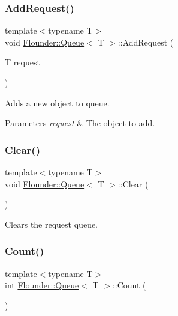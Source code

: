 \subsubsection{\texorpdfstring{Add\+Request()}{AddRequest()}}
{\footnotesize\ttfamily template$<$typename T$>$ \\
void \hyperlink{class_flounder_1_1_queue}{Flounder\+::\+Queue}$<$ T $>$\+::Add\+Request (\begin{DoxyParamCaption}\item[{T}]{request }\end{DoxyParamCaption})\hspace{0.3cm}{\ttfamily [inline]}}



Adds a new object to queue. 


\begin{DoxyParams}{Parameters}
{\em request} & The object to add. \\
\hline
\end{DoxyParams}
\mbox{\label{class_flounder_1_1_queue_afbaa486e15b7f7b6c08dd568e75024a6}} 
\subsubsection{\texorpdfstring{Clear()}{Clear()}}
{\footnotesize\ttfamily template$<$typename T$>$ \\
void \hyperlink{class_flounder_1_1_queue}{Flounder\+::\+Queue}$<$ T $>$\+::Clear (\begin{DoxyParamCaption}{ }\end{DoxyParamCaption})\hspace{0.3cm}{\ttfamily [inline]}}



Clears the request queue. 

\mbox{\label{class_flounder_1_1_queue_a6e69f20bb86b6f1b941225005901e3ea}} 
\subsubsection{\texorpdfstring{Count()}{Count()}}
{\footnotesize\ttfamily template$<$typename T$>$ \\
int \hyperlink{class_flounder_1_1_queue}{Flounder\+::\+Queue}$<$ T $>$\+::Count (\begin{DoxyParamCaption}{ }\end{DoxyParamCaption})\hspace{0.3cm}{\ttfamily [inline]}}



